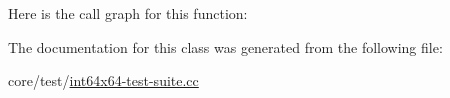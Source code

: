 Here is the call graph for this function\+:




The documentation for this class was generated from the following file\+:\begin{DoxyCompactItemize}
\item 
core/test/\hyperlink{int64x64-test-suite_8cc}{int64x64-\/test-\/suite.\+cc}\end{DoxyCompactItemize}
